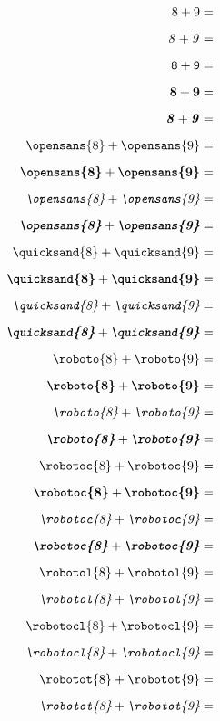 \documentclass[a4paper,12pt]{article}
\begin{document}
\begin{multicols}{5}
\begin{align*}
\end{align*}
\begin{align*}
\mathrm{8}+\mathrm{9}&=\\[0.6em]
\mathit{8}+\mathit{9}&=\\[0.6em]
\mathtt{8}+\mathtt{9}&=\\[0.6em]
\mathbf{8}+\mathbf{9}&=\\[0.6em]
\textbf{\textit{8}}+\textbf{\textit{9}}&=\\[0.6em]
\textrm{\opensans{8}}+\textrm{\opensans{9}}&=\\[0.6em]
\textbf{\opensans{8}}+\textbf{\opensans{9}}&=\\[0.6em]
\textit{\opensans{8}}+\textit{\opensans{9}}&=\\[0.6em]
\textbf{\textit{\opensans{8}}}+\textbf{\textit{\opensans{9}}}&=\\[0.6em]
\textrm{\quicksand{8}}+\textrm{\quicksand{9}}&=\\[0.6em]
\textbf{\quicksand{8}}+\textbf{\quicksand{9}}&=\\[0.6em]
\textit{\quicksand{8}}+\textit{\quicksand{9}}&=\\[0.6em]
\textbf{\textit{\quicksand{8}}}+\textbf{\textit{\quicksand{9}}}&=\\[0.6em]
\textrm{\roboto{8}}+\textrm{\roboto{9}}&=\\[0.6em]
\textbf{\roboto{8}}+\textbf{\roboto{9}}&=\\[0.6em]
\textit{\roboto{8}}+\textit{\roboto{9}}&=\\[0.6em]
\textbf{\textit{\roboto{8}}}+\textbf{\textit{\roboto{9}}}&=\\[0.6em]
\textrm{\robotoc{8}}+\textrm{\robotoc{9}}&=\\[0.6em]
\textbf{\robotoc{8}}+\textbf{\robotoc{9}}&=\\[0.6em]
\textit{\robotoc{8}}+\textit{\robotoc{9}}&=\\[0.6em]
\textbf{\textit{\robotoc{8}}}+\textbf{\textit{\robotoc{9}}}&=\\[0.6em]
\textrm{\robotol{8}}+\textrm{\robotol{9}}&=\\[0.6em]
\textit{\robotol{8}}+\textit{\robotol{9}}&=\\[0.6em]
\textrm{\robotocl{8}}+\textrm{\robotocl{9}}&=\\[0.6em]
\textit{\robotocl{8}}+\textit{\robotocl{9}}&=\\[0.6em]
\textrm{\robotot{8}}+\textrm{\robotot{9}}&=\\[0.6em]
\textit{\robotot{8}}+\textit{\robotot{9}}&=\\[0.6em]
\end{align*}
\end{multicols}
\end{document}
